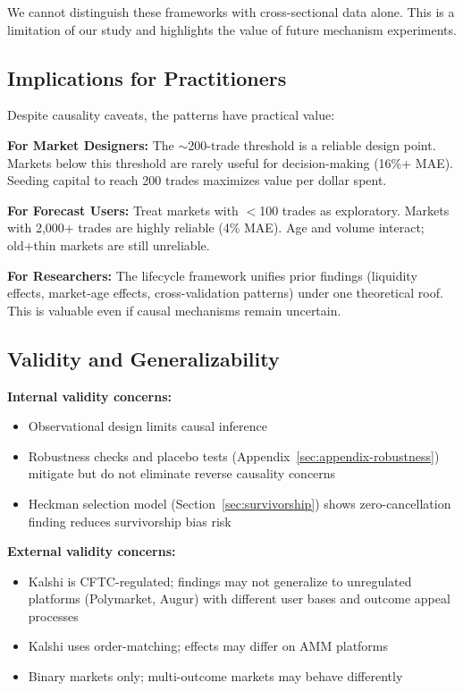 \documentclass[12pt,letterpaper]{article}
\begin{document}
We cannot distinguish these frameworks with cross-sectional data alone. This is a limitation of our study and highlights the value of future mechanism experiments.

\subsection{Implications for Practitioners}

Despite causality caveats, the patterns have practical value:

\textbf{For Market Designers:} The $\sim$200-trade threshold is a reliable design point. Markets below this threshold are rarely useful for decision-making (16\%+ MAE). Seeding capital to reach 200 trades maximizes value per dollar spent.

\textbf{For Forecast Users:} Treat markets with $<$100 trades as exploratory. Markets with 2,000+ trades are highly reliable (4\% MAE). Age and volume interact; old+thin markets are still unreliable.

\textbf{For Researchers:} The lifecycle framework unifies prior findings (liquidity effects, market-age effects, cross-validation patterns) under one theoretical roof. This is valuable even if causal mechanisms remain uncertain.

\subsection{Validity and Generalizability}

\textbf{Internal validity concerns:}
\begin{itemize}
    \item Observational design limits causal inference
    \item Robustness checks and placebo tests (Appendix~\ref{sec:appendix-robustness}) mitigate but do not eliminate reverse causality concerns
    \item Heckman selection model (Section~\ref{sec:survivorship}) shows zero-cancellation finding reduces survivorship bias risk
\end{itemize}

\textbf{External validity concerns:}
\begin{itemize}
    \item Kalshi is CFTC-regulated; findings may not generalize to unregulated platforms (Polymarket, Augur) with different user bases and outcome appeal processes
    \item Kalshi uses order-matching; effects may differ on AMM platforms
    \item Binary markets only; multi-outcome markets may behave differently
\end{itemize}
\end{document}
